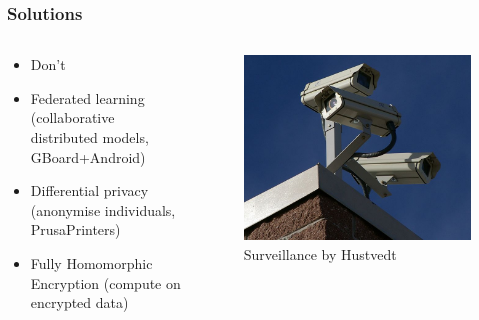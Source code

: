 \documentclass[aspectratio=169]{beamer}
\begin{document}
  \begin{frame}
    \frametitle{Solutions}
    \begin{columns}
      \begin{column}{0.5\textwidth}
        \begin{itemize}
          \item Don't
          \item Federated learning (collaborative distributed models, GBoard+Android)
          \item Differential privacy (anonymise individuals, PrusaPrinters)
          \item Fully Homomorphic Encryption (compute on encrypted data)
        \end{itemize}
      \end{column}
      \begin{column}{0.5\textwidth}
        \begin{figure}[th!]
          \centering
          \includegraphics[width=1\textwidth]{surveillance.jpg}
          \caption{Surveillance by Hustvedt \autocite{cc}}
          \label{fig:jim_carrey}
        \end{figure}
      \end{column}
    \end{columns}
  \end{frame}
\end{document}
